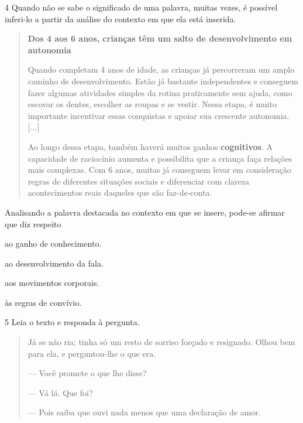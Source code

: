 \num{4} Quando não se sabe o significado de uma palavra, muitas vezes, é
possível inferi-lo a partir da análise do contexto em que ela está
inserida.

\begin{quote}
\textbf{Dos 4 aos 6 anos, crianças têm um salto de desenvolvimento em autonomia}

Quando completam 4 anos de idade, as crianças já percorreram um amplo
caminho de desenvolvimento. Estão já bastante independentes e conseguem
fazer algumas atividades simples da rotina praticamente sem ajuda, como
escovar os dentes, escolher as roupas e se vestir. Nessa etapa, é muito
importante incentivar essas conquistas e apoiar sua crescente autonomia.
{[}...{]}

Ao longo dessa etapa, também haverá muitos ganhos \textbf{cognitivos}. A
capacidade de raciocínio aumenta e possibilita que a criança faça
relações mais complexas. Com 6 anos, muitas já conseguem levar em
consideração regras de diferentes situações sociais e diferenciar com
clareza acontecimentos reais daqueles que são faz-de-conta.
\end{quote}


Analisando a palavra destacada no contexto em que se insere, 
pode-se afirmar que diz respeito

\begin{escolha}
\item ao ganho de conhecimento.

\item ao desenvolvimento da fala.

\item aos movimentos corporais.

\item às regras de convívio.
\end{escolha}

\num{5} Leia o texto e responda à pergunta.

\begin{quote}
Já se não ria; tinha só um resto de sorriso forçado e resignado. Olhou
bem para ela, e perguntou-lhe o que era.

--- Você promete o que lhe disse?

--- Vá lá. Que foi?

--- Pois saiba que ouvi nada menos que uma declaração de amor.
\end{quote}


